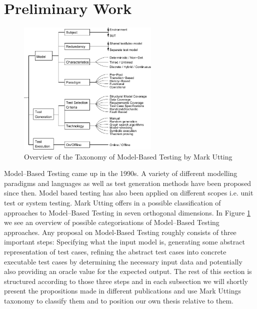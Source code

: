 \section{Preliminary Work}
\label{sec:RelatedWork}
\begin{figure}
\includegraphics[width=0.6\textwidth]{./pics/taxonomyOfMBT.pdf}
\caption{Overview of the Taxonomy of Model-Based Testing by Mark Utting \cite{utting2006taxonomy}}
\label{fig:UttingTaxonomy}
\end{figure}
Model--Based Testing came up in the 1990s. A variety of different modelling paradigms and languages as well as test generation methods have been proposed since then. Model based testing has also been applied on different scopes i.e. unit test or system testing. Mark Utting offers in \cite{utting2006taxonomy} a possible classification of approaches to Model--Based Testing in seven orthogonal dimensions. In Figure \ref{fig:UttingTaxonomy} we see an overview of possible categorisations of Model--Based Testing approaches. Any proposal on Model-Based Testing roughly consists of three important steps: Specifying what the input model is, generating some abstract representation of test cases, refining the abstract test cases into concrete executable test cases by determining the necessary input data and potentially also providing an oracle value for the expected output. The rest of this section is structured according to those three steps and in each subsection we will shortly present the propositions made in different publications and use Mark Uttings taxonomy to classify them and to position our own thesis relative to them.
% 
